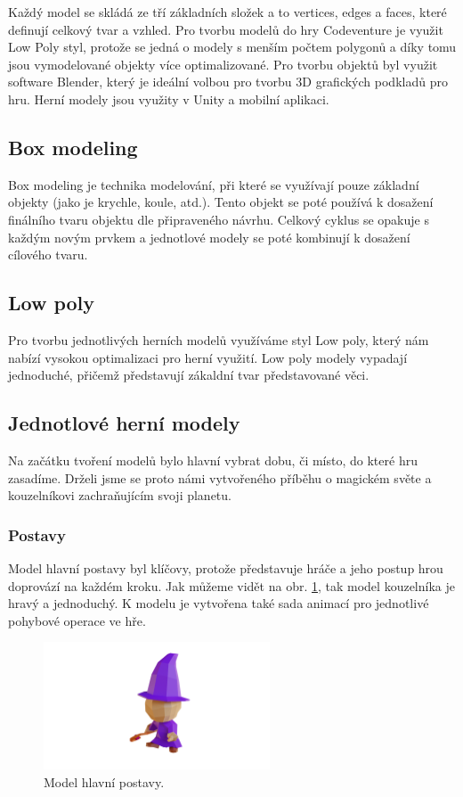 Každý model se skládá ze tří základních složek a to vertices, edges a faces, které definují celkový tvar a vzhled. Pro tvorbu modelů do hry Codeventure je využit Low Poly styl, protože se jedná o modely s menším počtem polygonů a díky tomu jsou vymodelované objekty více optimalizované. Pro tvorbu objektů byl využit software Blender, který je ideální volbou pro tvorbu 3D grafických podkladů pro hru. Herní modely jsou využity v Unity a mobilní aplikaci.

\subsection{Box modeling}
Box modeling je technika modelování, při které se využívají pouze základní objekty (jako je krychle, koule, atd.). Tento objekt se poté používá k dosažení finálního tvaru objektu dle připraveného návrhu. Celkový cyklus se opakuje s každým novým prvkem a jednotlové modely se poté kombinují k dosažení cílového tvaru.

\subsection{Low poly}
Pro tvorbu jednotlivých herních modelů využíváme styl Low poly, který nám nabízí vysokou optimalizaci pro herní využití. Low poly modely vypadají jednoduché, přičemž představují zákaldní tvar představované věci.

\subsection{Jednotlové herní modely}
Na začátku tvoření modelů bylo hlavní vybrat dobu, či místo, do které hru zasadíme. Drželi jsme se proto námi vytvořeného příběhu o magickém světe a kouzelníkovi zachraňujícím svoji planetu.

\subsubsection{Postavy}
Model hlavní postavy byl klíčovy, protože představuje hráče a jeho postup hrou doprovází na každém kroku. Jak můžeme vidět na obr. \ref{fig:hlavni-postava}, tak model kouzelníka je hravý a jednoduchý. K modelu je vytvořena také sada animací pro jednotlivé pohybové operace ve hře.

\begin{figure}[h]
    \centering
    \includegraphics[width=0.6\textwidth]{img/hlavni-postava.png}
    \caption{Model hlavní postavy.}
    \label{fig:hlavni-postava}
\end{figure}

